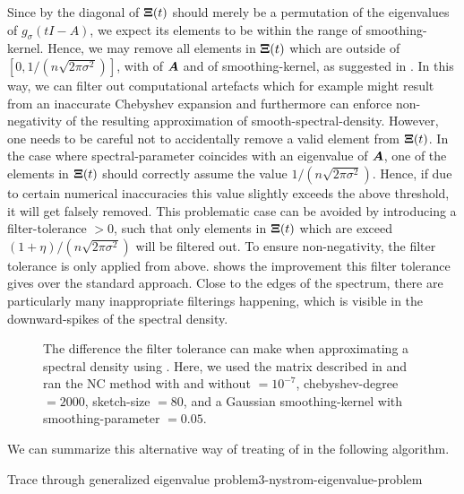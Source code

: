 Since by  the diagonal of $\boldsymbol{\Xi}(t)$
should merely be a permutation of the eigenvalues of $g_{\sigma}(tI - A)$,
we expect its elements to be within the range of \gls{smoothing-kernel}. Hence, we may remove
all elements in $\boldsymbol{\Xi}(t)$ which are outside of $[0, 1 / (n \sqrt{2 \pi \sigma^2})]$,
with  of $\boldsymbol{A}$ and  of \gls{smoothing-kernel},
as suggested in \cite{lin2017randomized}.
In this way, we can filter out computational artefacts which for example might result
from an inaccurate Chebyshev expansion and furthermore 
can enforce non-negativity of the resulting approximation of
\gls{smooth-spectral-density}. However, one needs to be careful not to accidentally
remove a valid element from $\boldsymbol{\Xi}(t)$. In the case where \gls{spectral-parameter}
coincides with an eigenvalue of $\boldsymbol{A}$, one of the elements in $\boldsymbol{\Xi}(t)$
should correctly assume the value $1 / (n \sqrt{2 \pi \sigma^2})$. Hence, if due to
certain numerical inaccuracies this value slightly exceeds the above threshold,
it will get falsely removed. This problematic case can be avoided by introducing a
\gls{filter-tolerance} $>0$, such that only elements in $\boldsymbol{\Xi}(t)$ which are
exceed $ (1 + \eta) / (n \sqrt{2 \pi \sigma^2})$ will be filtered out. To ensure
non-negativity, the filter tolerance is only applied from above. 
shows the improvement this filter tolerance gives over the standard approach.
Close to the edges of the spectrum, there are particularly many inappropriate
filterings happening, which is visible in the downward-spikes of the spectral density.

\begin{figure}[ht]
    \centering
    
    \caption{The difference the filter tolerance can make when approximating
        a spectral density using . 
        Here, we used the matrix described in 
        and ran the \gls{NC} method with and without  $= 10^{-7}$,
        \gls{chebyshev-degree} $=2000$, \gls{sketch-size} $=80$, and a
        Gaussian \gls{smoothing-kernel} with \gls{smoothing-parameter} $=0.05$.}
    \label{fig:3-nystrom-filter-tolerance}
\end{figure}

We can summarize this alternative way of treating
 of 
in the following algorithm.
\begin{algo}{Trace through generalized eigenvalue problem}{3-nystrom-eigenvalue-problem}
    
\end{algo}

